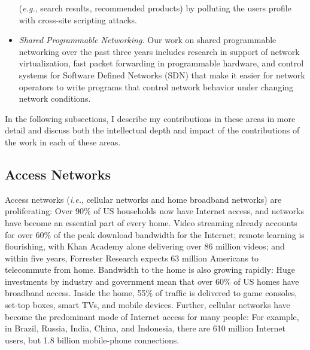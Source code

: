 \documentclass{article}
\newcommand{\ie}{{\em i.e.}}
\newcommand{\eg}{{\em e.g.}}
\begin{document}
\begin{itemize}
(\eg, search results, recommended products) by polluting the users
profile with cross-site scripting attacks.
% 
\item {\em Shared Programmable Networking.} Our work on 
shared programmable networking over the past three years includes
research in support of network virtualization, fast packet forwarding in
programmable hardware, and control systems for Software Defined Networks
(SDN) that make it easier for network operators to write programs that
control network behavior under changing network conditions.
\end{itemize}
\noindent
In the following subsections, I describe my contributions in these areas
in more detail and discuss both the intellectual depth and impact of the
contributions of the work in each of these areas.

\subsection*{Access Networks}

Access networks (\ie, cellular networks and home broadband networks) are
proliferating: Over 90\% of US households now have Internet access, and
networks have become an essential part of every home.  Video streaming
already accounts for over 60\% of the peak download bandwidth for the
Internet;
remote learning is flourishing, with Khan Academy alone delivering over
86 million videos; and within five years, Forrester
Research expects 63 million Americans to telecommute from
home. Bandwidth to the home is also growing
rapidly: Huge investments by industry and government mean that over 60\%
of US homes have broadband access.  Inside the
home, 55\% of traffic is delivered to game consoles, set-top boxes,
smart TVs, and mobile devices.  Further, cellular
networks have become the predominant mode of Internet access for many
people: For example, in Brazil, Russia, India, China, and Indonesia,
there are 610 million Internet users, but 1.8 billion mobile-phone
connections.
\end{document}
